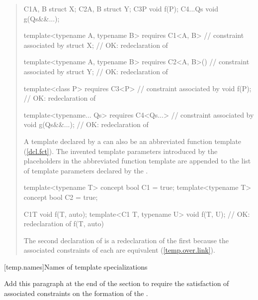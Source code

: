 \begin{quote}
\begin{codeblock}
C1{A, B} struct X;
C2{A, B} struct Y;
C3{P} void f(P);
C4{...Qs} void g(Qs&&...);

template<typename A, typename B> 
  requires C1<A, B> // constraint associated by 
    struct X;       // OK: redeclaration of 

template<typename A, typename B> 
  requires C2<A, B>()  // constraint associated by 
    struct Y;          // OK: redeclaration of 

template<class P>
  requires C3<P> // constraint associated by 
    void f(P);   // OK: redeclaration of 

template<typename... Qs>
  requires C4<Qs...> // constraint associated by 
    void g(Qs&&...); // OK: redeclaration of 
\end{codeblock}
\exitexample


\pnum
A template declared by a  can also be 
an abbreviated function template (\ref{dcl.fct}). 
% 
The invented template parameters introduced by the placeholders in the 
abbreviated function template are appended to the list of template parameters 
declared by the .
% 
\enterexample
\begin{codeblock}
template<typename T> concept bool C1 = true;
template<typename T> concept bool C2 = true;

C1{T} void f(T, auto);
template<C1 T, typename U> void f(T, U); // OK: redeclaration of f(T, auto)
\end{codeblock}
% 
\enternote
The second declaration of  is a redeclaration of the first
because the associated constraints of each are equivalent 
(\ref{temp.over.link}).
\exitnote
\exitexample

\end{quote}

[temp.names]{Names of template specializations}

Add this paragraph at the end of the section to require the satisfaction of 
associated constraints on the formation of the .

